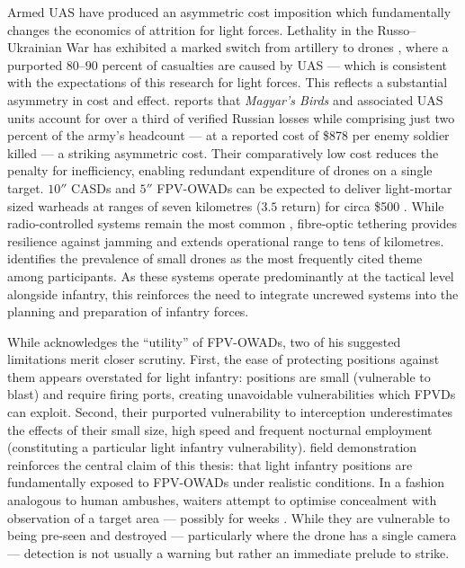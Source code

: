 {%
Armed UAS have produced an asymmetric cost imposition which fundamentally changes the economics of attrition for light forces. Lethality in the Russo--Ukrainian War has exhibited a marked switch from artillery to drones \parencite{zafra_2024_03_26_drone_combat_ukraine}, where a purported $80$--$90$ percent of casualties are caused by UAS \parencite{hartog_2026_01_26_drones_casualties_ukraine,TCAG_Brad,zelenskyy_2026_03_17} --- which is consistent with the expectations of this research for light forces. This reflects a substantial asymmetry in cost and effect. \textcite{magyar_telegram_MAR_22} reports that \textit{Magyar's Birds} and associated UAS units account for over a third of verified Russian losses while comprising just two percent of the army's headcount --- at a reported cost of \$878 per enemy soldier killed --- a striking asymmetric cost. Their comparatively low cost reduces the penalty for inefficiency, enabling redundant expenditure of drones on a single target. $10''$ CASDs and $5''$ FPV-OWADs can be expected to deliver light-mortar sized warheads at ranges of seven kilometres ($3.5$ return) for circa \$500 \parencite[2:08--3:20]{civdiv_8}. While radio-controlled systems remain the most common \parencite[0:04--0:18]{civdiv_5}, fibre-optic tethering provides resilience against jamming and extends operational range to tens of kilometres. \textcite[10]{MOLLOY_2024} identifies the prevalence of small drones as the most frequently cited theme among participants. As these systems operate predominantly at the tactical level alongside infantry, this reinforces the need to integrate uncrewed systems into the planning and preparation of infantry forces. 


While \textcite[15]{watling_2025_10} acknowledges the ``utility'' of FPV-OWADs, two of his suggested limitations merit closer scrutiny. First, the ease of protecting positions against them appears overstated for light infantry: positions are small (vulnerable to blast) and require firing ports, creating unavoidable vulnerabilities which FPVDs can exploit. Second, their purported vulnerability to interception underestimates the effects of their small size, high speed and frequent nocturnal employment (constituting a particular light infantry vulnerability).  field demonstration reinforces the central claim of this thesis: that light infantry positions are fundamentally exposed to FPV-OWADs under realistic conditions. In a fashion analogous to human ambushes, \gls{waiters} attempt to optimise concealment with observation of a target area --- possibly for weeks \parencite{Stepanenko_2025b}. While they are vulnerable to being pre-seen and destroyed --- particularly where the drone has a single camera --- detection is not usually a warning but rather an immediate prelude to strike.

}
